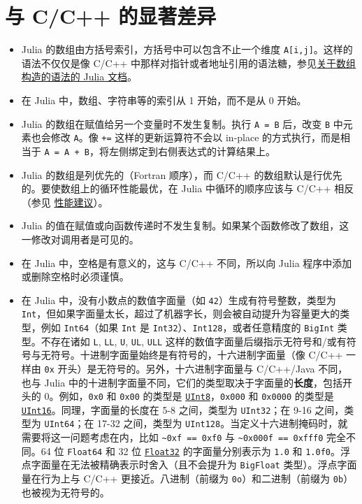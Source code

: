 \hypertarget{30781051824837113}{}


\section{与 C/C++ 的显著差异}



\begin{itemize}
\item Julia 的数组由方括号索引，方括号中可以包含不止一个维度 \texttt{A[i,j]}。这样的语法不仅仅是像 C/C++ 中那样对指针或者地址引用的语法糖，参见\hyperlink{16720099245556932994}{关于数组构造的语法的 Julia 文档}。


\item 在 Julia 中，数组、字符串等的索引从 1 开始，而不是从 0 开始。


\item Julia 的数组在赋值给另一个变量时不发生复制。执行 \texttt{A = B} 后，改变 \texttt{B} 中元素也会修改 \texttt{A}。像 \texttt{+=} 这样的更新运算符不会以 in-place 的方式执行，而是相当于 \texttt{A = A + B}，将左侧绑定到右侧表达式的计算结果上。


\item Julia 的数组是列优先的（Fortran 顺序），而 C/C++ 的数组默认是行优先的。要使数组上的循环性能最优，在 Julia 中循环的顺序应该与 C/C++ 相反（参见 \hyperlink{818954303942149020}{性能建议}）。


\item Julia 的值在赋值或向函数传递时不发生复制。如果某个函数修改了数组，这一修改对调用者是可见的。


\item 在 Julia 中，空格是有意义的，这与 C/C++ 不同，所以向 Julia 程序中添加或删除空格时必须谨慎。


\item 在 Julia 中，没有小数点的数值字面量（如 \texttt{42}）生成有符号整数，类型为 \texttt{Int}，但如果字面量太长，超过了机器字长，则会被自动提升为容量更大的类型，例如 \texttt{Int64}（如果 \texttt{Int} 是 \texttt{Int32}）、\texttt{Int128}，或者任意精度的 \texttt{BigInt} 类型。不存在诸如 \texttt{L}, \texttt{LL}, \texttt{U}, \texttt{UL}, \texttt{ULL} 这样的数值字面量后缀指示无符号和/或有符号与无符号。十进制字面量始终是有符号的，十六进制字面量（像 C/C++ 一样由 \texttt{0x} 开头）是无符号的。另外，十六进制字面量与 C/C++/Java 不同，也与 Julia 中的十进制字面量不同，它们的类型取决于字面量的\textbf{长度}，包括开头的 0。例如，\texttt{0x0} 和 \texttt{0x00} 的类型是 \hyperlink{6609065134969660118}{\texttt{UInt8}}，\texttt{0x000} 和 \texttt{0x0000} 的类型是 \hyperlink{7018610346698168012}{\texttt{UInt16}}。同理，字面量的长度在 5-8 之间，类型为 \texttt{UInt32}；在 9-16 之间，类型为 \texttt{UInt64}；在 17-32 之间，类型为 \texttt{UInt128}。当定义十六进制掩码时，就需要将这一问题考虑在内，比如 \texttt{{\textasciitilde}0xf == 0xf0} 与 \texttt{{\textasciitilde}0x000f == 0xfff0} 完全不同。64 位 \texttt{Float64} 和 32 位 \hyperlink{8101639384272933082}{\texttt{Float32}} 的字面量分别表示为 \texttt{1.0} 和 \texttt{1.0f0}。浮点字面量在无法被精确表示时舍入（且不会提升为 \texttt{BigFloat} 类型）。浮点字面量在行为上与 C/C++ 更接近。八进制（前缀为 \texttt{0o}）和二进制（前缀为 \texttt{0b}）也被视为无符号的。



\end{itemize}
